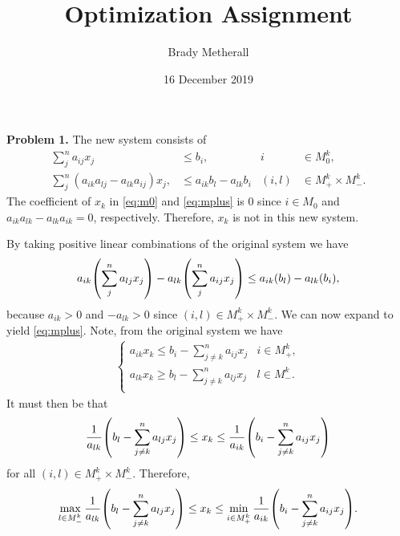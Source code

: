 \documentclass[11pt,a4paper]{article}
\title{Optimization Assignment}
\author{Brady Metherall}
\date{16 December 2019}
\let\originalleft\left
\let\originalright\right
\renewcommand{\left}{\mathopen{}\mathclose\bgroup\originalleft}
\renewcommand{\right}{\aftergroup\egroup\originalright}
\begin{document}
\maketitle


\textbf{Problem 1.}
The new system consists of
\begin{align}
	\sum_j^n a_{ij} x_j &\leq b_i, & i &\in M_0^k, \label{eq:m0} \\
	\sum_j^n (a_{ik} a_{lj} - a_{lk} a_{ij}) x_j, &\leq a_{ik} b_l - a_{lk} b_i & (i,l) &\in M_+^k \times M_-^k. \label{eq:mplus}
\end{align}
The coefficient of $x_k$ in \eqref{eq:m0} and \eqref{eq:mplus} is 0 since $i \in M_0$ and $a_{ik} a_{lk} - a_{lk} a_{ik} = 0$, respectively. Therefore, $x_k$ is not in this new system.

By taking positive linear combinations of the original system we have
\begin{align*}
	a_{ik} \left( \sum_j^n a_{lj} x_j \right) - a_{lk} \left( \sum_j^n a_{ij} x_j \right) \leq a_{ik} \left( b_l \right) - a_{lk} \left( b_i \right),
\end{align*}
because $a_{ik} > 0$ and $-a_{lk} > 0$ since $(i, l) \in M_+^k \times M_-^k$. We can now expand to yield \eqref{eq:mplus}. Note, from the original system we have
\begin{align*}
	\begin{cases}
		\displaystyle a_{ik} x_k \leq b_i - \sum_{j \neq k}^n a_{ij} x_j & i \in M_+^k, \\
		\displaystyle a_{lk} x_k \geq b_l - \sum_{j \neq k}^n a_{lj} x_j & l \in M_-^k. \\
	\end{cases}
\end{align*}
It must then be that
\begin{align*}
	\frac{1}{a_{lk}} \left( b_l - \sum_{j \neq k}^n a_{lj} x_j \right) \leq x_k \leq \frac{1}{a_{ik}} \left( b_i - \sum_{j \neq k}^n a_{ij} x_j \right)
\end{align*}
for all $(i, l) \in M_+^k \times M_-^k$. Therefore,
\begin{align*}
	\max_{l \in M_-^k} \frac{1}{a_{lk}} \left( b_l - \sum_{j \neq k}^n a_{lj} x_j \right) \leq x_k \leq \min_{i \in M_+^k} \frac{1}{a_{ik}} \left( b_i - \sum_{j \neq k}^n a_{ij} x_j \right).
\end{align*}
\end{document}
